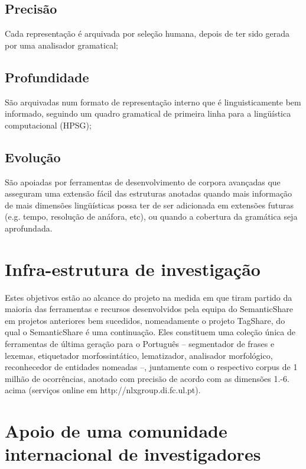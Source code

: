 \subsection{Precisão} %
\label{sub:semantic_precisao}
Cada representação é arquivada por seleção humana, depois de ter sido gerada por uma analisador gramatical;


\subsection{Profundidade} %
\label{sub:semantic_profundidade}

São arquivadas num formato de representação interno que é linguisticamente bem informado, seguindo um quadro gramatical de primeira linha para a lingüística computacional (HPSG);


\subsection{Evolução} %
\label{sub:semantic_evolucao}

São apoiadas por ferramentas de desenvolvimento de corpora avançadas que asseguram uma extensão fácil das estruturas anotadas quando mais informação de mais dimensões lingüísticas possa ter de ser adicionada em extensões futuras (e.g. tempo, resolução de anáfora, etc), ou quando a cobertura da gramática seja aprofundada.


\section{Infra-estrutura de investigação} %
\label{sec:semantic_infra}

Estes objetivos estão ao alcance do projeto na medida em que tiram partido da maioria das ferramentas e recursos desenvolvidos pela equipa do SemanticShare em projetos anteriores bem sucedidos, nomeadamente o projeto TagShare, do qual o SemanticShare é uma continuação. Eles constituem uma coleção única de ferramentas de última geração para o Português -- segmentador de frases e lexemas, etiquetador morfossintático, lematizador, analisador morfológico, reconhecedor de entidades nomeadas --, juntamente com o respectivo corpus de 1 milhão de ocorrências, anotado com precisão de acordo com as dimensões 1.-6. acima (serviços online em http://nlxgroup.di.fc.ul.pt).


\section{Apoio de uma comunidade internacional de investigadores} %
\label{sec:semantic_apoio}

